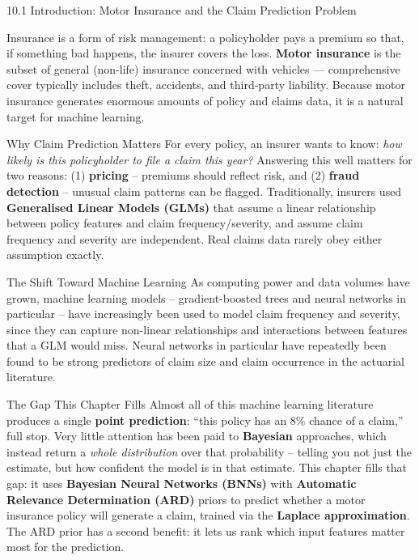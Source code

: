 \documentclass[aspectratio=169,10pt]{beamer}
\begin{document}
\begin{frame}[allowframebreaks]{10.1 Introduction: Motor Insurance and the Claim Prediction Problem}

Insurance is a form of risk management: a policyholder pays a premium so that,
if something bad happens, the insurer covers the loss. \textbf{Motor insurance}
is the subset of general (non-life) insurance concerned with vehicles ---
comprehensive cover typically includes theft, accidents, and third-party
liability. Because motor insurance generates enormous amounts of policy and
claims data, it is a natural target for machine learning.

  \begin{block}{Why Claim Prediction Matters}
    For every policy, an insurer wants to know: \emph{how likely is this
    policyholder to file a claim this year?}  Answering this well matters for
    two reasons: (1) \textbf{pricing} -- premiums should reflect risk, and
    (2) \textbf{fraud detection} -- unusual claim patterns can be flagged.
    Traditionally, insurers used \textbf{Generalised Linear Models (GLMs)}
    that assume a linear relationship between policy features and claim
    frequency/severity, and assume claim frequency and severity are
    independent. Real claims data rarely obey either assumption exactly.
  \end{block}

  \begin{block}{The Shift Toward Machine Learning}
    As computing power and data volumes have grown, machine learning models
    -- gradient-boosted trees and neural networks in particular -- have
    increasingly been used to model claim frequency and severity, since they
    can capture non-linear relationships and interactions between features
    that a GLM would miss. Neural networks in particular have repeatedly been
    found to be strong predictors of claim size and claim occurrence in the
    actuarial literature.
  \end{block}

  \begin{alertblock}{The Gap This Chapter Fills}
    Almost all of this machine learning literature produces a single
    \textbf{point prediction}: ``this policy has an 8\% chance of a claim,''
    full stop. Very little attention has been paid to \textbf{Bayesian}
    approaches, which instead return a \emph{whole distribution} over that
    probability -- telling you not just the estimate, but how confident the
    model is in that estimate. This chapter fills that gap: it uses
    \textbf{Bayesian Neural Networks (BNNs)} with \textbf{Automatic Relevance
    Determination (ARD)} priors to predict whether a motor insurance policy
    will generate a claim, trained via the \textbf{Laplace approximation}.
    The ARD prior has a second benefit: it lets us rank which input features
    matter most for the prediction.
  \end{alertblock}


\end{frame}
\end{document}
